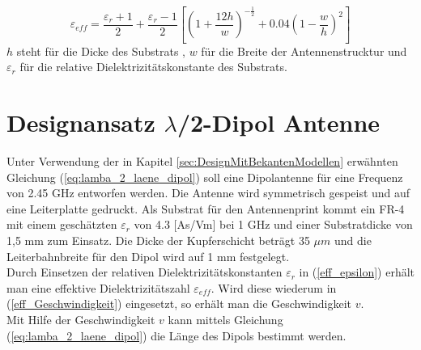 \begin{equation}\label{eff_epsilon}
\varepsilon_{eff}=\dfrac{\varepsilon_r+1}{2}+\dfrac{\varepsilon_r-1}{2}\left[\left(1+\dfrac{12h}{w}\right)^{-\frac{1}{2}}+0.04\left(1-\dfrac{w}{h}\right)^{2}\right]
\end{equation}
$h$ steht für die Dicke des Substrats , $w$ für die Breite der Antennenstrucktur und  $\varepsilon_{r}$ für die relative Dielektrizitätskonstante des Substrats. 

\section{Designansatz $\lambda$/2-Dipol Antenne}  
Unter Verwendung der in Kapitel \ref{sec:DesignMitBekantenModellen} erwähnten Gleichung (\ref{eq:lamba_2_laene_dipol}) soll eine Dipolantenne für eine Frequenz von 2.45 GHz entworfen werden. Die Antenne wird symmetrisch gespeist und auf eine Leiterplatte gedruckt. Als Substrat für den Antennenprint kommt ein  FR-4  mit einem geschätzten  $\varepsilon_r $ von 4.3 [As/Vm] bei 1 GHz und einer Substratdicke von 1,5 mm  zum Einsatz. Die Dicke der Kupferschicht beträgt 35 $\mu m$ und  die Leiterbahnbreite für den Dipol wird auf 1 mm festgelegt.\\
Durch Einsetzen der relativen Dielektrizitätskonstanten $\varepsilon_{r}$ in (\ref{eff_epsilon}) erhält man eine effektive Dielektrizitätszahl $\varepsilon_{eff}$.
Wird diese wiederum in (\ref{eff_Geschwindigkeit}) eingesetzt, so erhält man die Geschwindigkeit $v$. \\
Mit Hilfe der Geschwindigkeit $v$ kann mittels Gleichung (\ref{eq:lamba_2_laene_dipol}) die Länge des Dipols bestimmt werden. 

